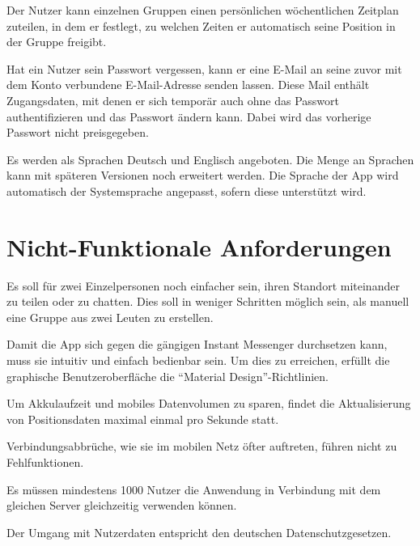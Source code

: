 \documentclass[parskip=full,11pt]{scrartcl}
\begin{document}
%
Der Nutzer kann einzelnen Gruppen einen persönlichen wöchentlichen Zeitplan
zuteilen, in dem er festlegt, zu welchen Zeiten er automatisch seine Position
in der Gruppe freigibt.

%
Hat ein Nutzer sein Passwort vergessen, kann er eine E-Mail an seine zuvor
mit dem Konto verbundene E-Mail-Adresse senden lassen.
Diese Mail enthält Zugangsdaten, mit denen er sich temporär auch ohne das
Passwort authentifizieren und das Passwort ändern kann.
Dabei wird das vorherige Passwort nicht preisgegeben.

\pagebreak
{}
Es werden als Sprachen Deutsch und Englisch angeboten.
Die Menge an Sprachen kann mit späteren Versionen noch erweitert
werden.
Die Sprache der App wird automatisch der Systemsprache angepasst, sofern diese
unterstützt wird.

\pagebreak
\section{Nicht-Funktionale Anforderungen}

%
Es soll für zwei Einzelpersonen noch einfacher sein, ihren Standort miteinander
zu teilen oder zu chatten. Dies soll in weniger Schritten möglich sein, als
manuell eine Gruppe aus zwei Leuten zu erstellen.

Damit die App sich gegen die gängigen Instant Messenger durchsetzen kann, muss
sie intuitiv und einfach bedienbar sein. Um dies zu erreichen, erfüllt die
graphische Benutzeroberfläche die \enquote{Material Design}-Richtlinien.

Um Akkulaufzeit und mobiles Datenvolumen zu sparen, findet die Aktualisierung
von Positionsdaten maximal einmal pro Sekunde statt.

Verbindungsabbrüche, wie sie im mobilen Netz öfter auftreten, führen nicht zu
Fehlfunktionen.

Es müssen mindestens 1000 Nutzer die Anwendung in Verbindung mit dem gleichen
Server gleichzeitig verwenden können.

%
Der Umgang mit Nutzerdaten entspricht den deutschen Datenschutzgesetzen.
\end{document}
